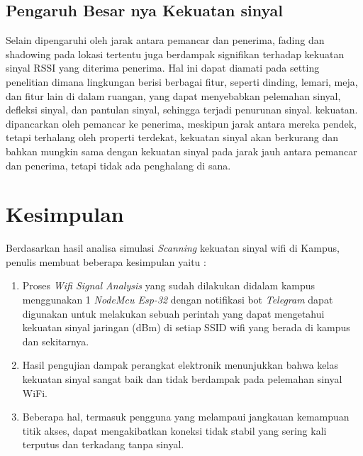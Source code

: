 \documentclass[conference]{IEEEtran}
\begin{document}
        \subsection{Pengaruh Besar nya Kekuatan sinyal}
Selain dipengaruhi oleh jarak antara pemancar dan penerima, fading dan shadowing pada lokasi tertentu juga berdampak signifikan terhadap kekuatan sinyal RSSI yang diterima penerima. Hal ini dapat diamati pada setting penelitian dimana lingkungan berisi berbagai fitur, seperti dinding, lemari, meja, dan fitur lain di dalam ruangan, yang dapat menyebabkan pelemahan sinyal, defleksi sinyal, dan pantulan sinyal, sehingga terjadi penurunan sinyal. kekuatan. dipancarkan oleh pemancar ke penerima, meskipun jarak antara mereka pendek, tetapi terhalang oleh properti terdekat, kekuatan sinyal akan berkurang dan bahkan mungkin sama dengan kekuatan sinyal pada jarak jauh antara pemancar dan penerima, tetapi tidak ada penghalang di sana.

\section{Kesimpulan}

Berdasarkan hasil analisa simulasi \textit{Scanning} kekuatan sinyal wifi di Kampus, penulis membuat beberapa kesimpulan yaitu :
\begin{enumerate}
    \item Proses \textit{Wifi Signal Analysis} yang sudah dilakukan didalam kampus  menggunakan 1 \textit{NodeMcu Esp-32} dengan notifikasi bot \textit{Telegram} dapat digunakan untuk melakukan sebuah perintah yang dapat mengetahui kekuatan sinyal jaringan (dBm)
    di setiap SSID wifi yang berada di kampus dan sekitarnya.
    \item Hasil pengujian dampak perangkat elektronik menunjukkan bahwa kelas kekuatan sinyal sangat baik dan tidak berdampak pada pelemahan sinyal WiFi.
   \item Beberapa hal, termasuk pengguna yang melampaui jangkauan kemampuan titik akses, dapat mengakibatkan koneksi tidak stabil yang sering kali terputus dan terkadang tanpa sinyal.
\end{enumerate}
\end{document}
